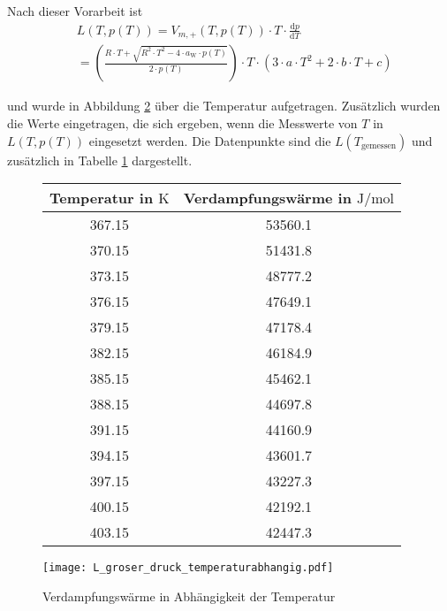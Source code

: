 Nach dieser Vorarbeit ist
\begin{align}
& L(T, p(T)) = V_{m,+}(T, p(T)) \cdot T \cdot \frac{\text{d} p}{\text{d} T} \\
&= \left(\frac{R \cdot T + \sqrt{R^2 \cdot T^2 - 4 \cdot a_\text{W} \cdot p(T)}}{2 \cdot p(T)}\right)  \cdot T \cdot \left(3 \cdot a \cdot T^2 + 2 \cdot b \cdot T + c \right) %
\end{align}

und wurde in Abbildung \ref{fig:L_groser_druck_temperaturabhangig} über die Temperatur aufgetragen. Zusätzlich wurden die Werte eingetragen, die sich ergeben, wenn die Messwerte von $T$ in $L(T, p(T))$ eingesetzt werden. Die Datenpunkte sind die $L(T_\text{gemessen})$ und zusätzlich in Tabelle \ref{tab:verdampfungswarme} dargestellt. 
\begin{figure}[h!]
	\centering
\begin{tabular}{c|c}
	Temperatur in $\si{\kelvin}$ &   Verdampfungswärme in $\si{\joule\per\mol}$ \\
	\hline
	367.15 &                                      53560.1 \\
	370.15 &                                      51431.8 \\
	373.15 &                                      48777.2 \\
	376.15 &                                      47649.1 \\
	379.15 &                                      47178.4 \\
	382.15 &                                      46184.9 \\
	385.15 &                                      45462.1 \\
	388.15 &                                      44697.8 \\
	391.15 &                                      44160.9 \\
	394.15 &                                      43601.7 \\
	397.15 &                                      43227.3 \\
	400.15 &                                      42192.1 \\
	403.15 &                                      42447.3 \\
\end{tabular}
	\label{tab:verdampfungswarme}
\end{figure}





\begin{figure}[h!]
	\centering
	\texttt{[image: L\_groser\_druck\_temperaturabhangig.pdf]}
	\caption{Verdampfungswärme in Abhängigkeit der Temperatur}
	\label{fig:L_groser_druck_temperaturabhangig}
\end{figure}





